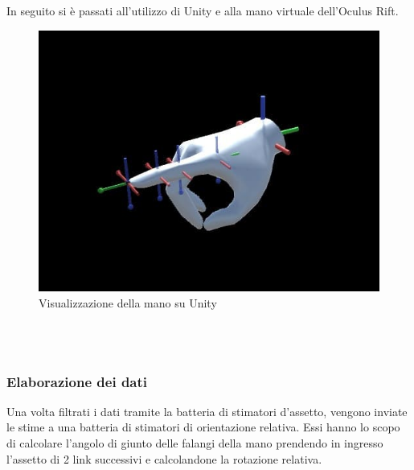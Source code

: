 In seguito si è passati all'utilizzo di Unity e alla mano virtuale dell'Oculus Rift.\\

\begin{figure}[H]
    \includegraphics[scale=1]{immagini/vrhandunity.jpg}
    \centering
    \caption{Visualizzazione della mano su Unity}
\end{figure}

\\\\

\subsubsection{Elaborazione dei dati}

Una volta filtrati i dati tramite la batteria di stimatori d'assetto, vengono inviate le stime a una batteria di stimatori di orientazione relativa. Essi hanno lo scopo di calcolare l'angolo di giunto delle falangi della mano prendendo in ingresso l'assetto di 2 link successivi e calcolandone la rotazione relativa.

